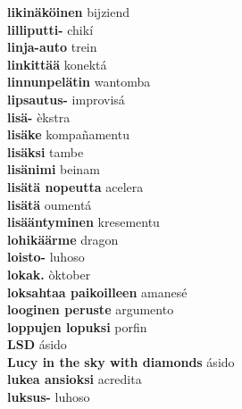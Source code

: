 \textbf{ likinäköinen  } bijziend \\
\textbf{ lilliputti-  } chikí \\
\textbf{ linja-auto  } trein \\
\textbf{ linkittää  } konektá \\
\textbf{ linnunpelätin  } wantomba \\
\textbf{ lipsautus-  } improvisá \\
\textbf{ lisä-  } èkstra \\
\textbf{ lisäke  } kompañamentu \\
\textbf{ lisäksi  } tambe \\
\textbf{ lisänimi  } beinam \\
\textbf{ lisätä nopeutta  } acelera \\
\textbf{ lisätä  } oumentá \\
\textbf{ lisääntyminen  } kresementu \\
\textbf{ lohikäärme  } dragon \\
\textbf{ loisto-  } luhoso \\
\textbf{ lokak.  } òktober \\
\textbf{ loksahtaa paikoilleen  } amanesé \\
\textbf{ looginen peruste  } argumento \\
\textbf{ loppujen lopuksi  } porfin \\
\textbf{ LSD  } ásido \\
\textbf{ Lucy in the sky with diamonds  } ásido \\
\textbf{ lukea ansioksi  } acredita \\
\textbf{ luksus-  } luhoso \\
